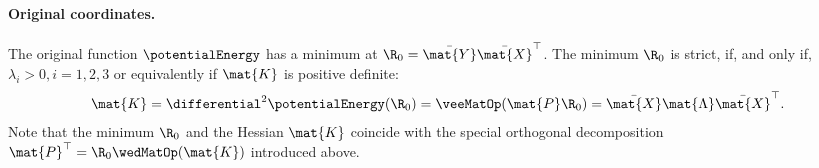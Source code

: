 \paragraph{Original coordinates.}
The original function $\potentialEnergy$ has a minimum at $\R_0 = \bar{\mat{Y}} \bar{\mat{X}}^\top$.
The minimum $\R_0$ is strict, if, and only if, $\lambda_i > 0, i=1,2,3$ or equivalently if $\mat{K}$ is positive definite:
\begin{align}
 \mat{K} = \differential^2 \potentialEnergy (\R_0) = \veeMatOp(\mat{P}\R_0) = \bar{\mat{X}} \mat{\Lambda} \bar{\mat{X}}^\top.
\end{align}
Note that the minimum $\R_0$ and the Hessian $\mat{K}$ coincide with the special orthogonal decomposition $\mat{P}^\top = \R_0 \wedMatOp(\mat{K})$ introduced above.

